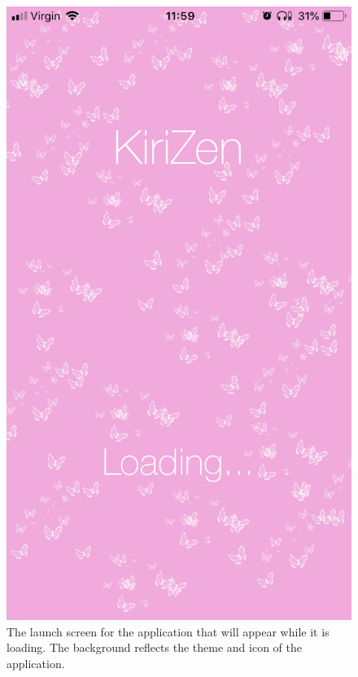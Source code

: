 \documentclass[11pt]{article}
\begin{document}
                    \begin{figure}[!ht]
                        \begin{minipage}{0.45\textwidth}
                            \centering \includegraphics[width=0.7\linewidth]{KiriZen/launchPage.png}
                            \caption{The launch screen for the application that will appear while it is loading. The background reflects the theme and icon of the application.}
                            \label{fig:kiriZen-launch}
                        \end{minipage}\hfill
                        \begin{minipage}{0.45\textwidth}
                            \centering

\end{minipage}
\end{figure}
\end{document}
